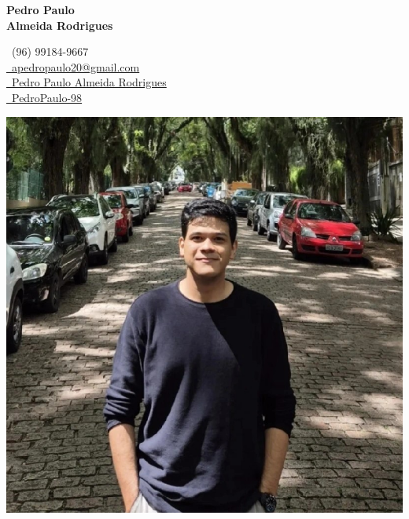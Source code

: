 \documentclass{article}
\begin{document}
\begin{center}
  \begin{minipage}{0.45\textwidth}
    {\Huge\bfseries Pedro Paulo \\ Almeida Rodrigues} \\[0.5ex] 
  \end{minipage}\hfill
  \begin{minipage}{0.35\textwidth}
    \faPhone\ (96) 99184-9667 \\
    \href{mailto:apedropaulo20@gmail.com}{\faEnvelope\ apedropaulo20@gmail.com} \\
    \href{https://www.linkedin.com/in/pedro-paulo-almeida-rodrigues-a788541a1}{\faLinkedin\ Pedro Paulo Almeida Rodrigues} \\
    \href{https://github.com/PedroPaulo-98}{\faGithub\ PedroPaulo-98}
  \end{minipage}
  \begin{minipage}{0.15\textwidth}
    \includegraphics[width=\linewidth]{pedro.jpg}
  \end{minipage}
\end{center}
\end{document}
